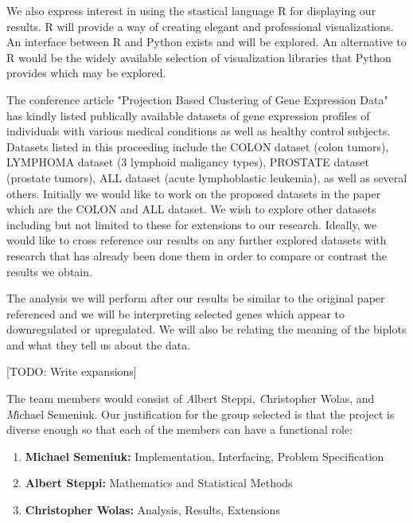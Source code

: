\documentclass[10pt,a4,oneside]{report}
\begin{document}
We also express interest in using the stastical language R for displaying our results. R will provide a way of creating elegant and professional visualizations. An interface between R and Python exists and will be explored. An alternative to R would be the widely available selection of visualization libraries that Python provides which may be explored.

The conference article "Projection Based Clustering of Gene Expression Data" \cite{TasoulisPT09} has kindly listed publically available datasets of gene expression profiles of individuals with various medical conditions as well as healthy control subjects. Datasets listed in this proceeding include the COLON dataset (colon tumors), LYMPHOMA dataset (3 lymphoid maligancy types), PROSTATE dataset (prostate tumors), ALL dataset (acute lymphoblastic leukemia), as well as several others. Initially we would like to work on the proposed datasets in the paper which are the COLON and ALL dataset. We wish to explore other datasets including but not limited to these for extensions to our research. Ideally, we would like to cross reference our results on any further explored datasets with research that has already been done them in order to compare or contrast the results we obtain.

The analysis we will perform after our results be similar to the original paper referenced and we will be interpreting selected genes which appear to downregulated or upregulated. We will also be relating the meaning of the biplots and what they tell us about the data.

[TODO: Write expansions]

The team members would consist of { \emph Albert Steppi}, {\emph Christopher Wolas}, and {\emph Michael Semeniuk}. Our justification for the group selected is that the project is diverse enough so that each of the members can have a functional role:
\begin{enumerate}  \itemsep -2pt %
\item
{\bf Michael Semeniuk:} Implementation, Interfacing, Problem Specification
\item
{\bf Albert Steppi:} Mathematics and Statistical Methods
\item
{\bf Christopher Wolas:} Analysis, Results, Extensions
\end{enumerate}


\end{document}
